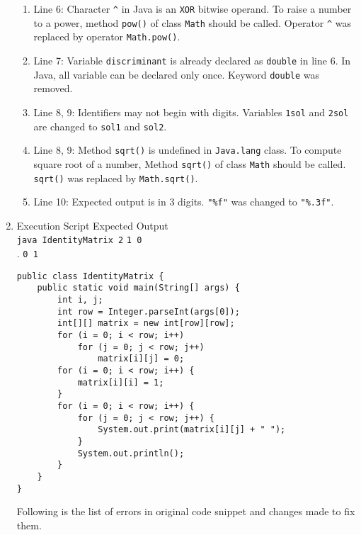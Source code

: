 \begin{enumerate}[label=\textbf{(\alph*)}]
\begin{enumerate}[label=\arabic*.]
\item Line 6: Character \texttt{\^} in Java is an \texttt{XOR} bitwise operand. To raise a number to a power, method \texttt{pow()} of class \texttt{Math} should be called. Operator \texttt{\^} was replaced by operator \texttt{Math.pow()}.
\item Line 7: Variable \texttt{discriminant} is already declared as \texttt{double} in line 6. In Java, all variable can be declared only once. Keyword \texttt{double} was removed.
\item Line 8, 9: Identifiers may not begin with digits. Variables \texttt{1sol} and \texttt{2sol} are changed to \texttt{sol1} and \texttt{sol2}.
\item Line 8, 9: Method \texttt{sqrt()} is undefined in \texttt{Java.lang} class. To compute square root of a number, Method \texttt{sqrt()} of class \texttt{Math} should be called. \texttt{sqrt()} was replaced by \texttt{Math.sqrt()}.
\item Line 10: Expected output is in 3 digits. \texttt{"\%f"} was changed to \texttt{"\%.3f"}.
\end{enumerate}

\item Execution Script \hfill Expected Output\\
\texttt{java IdentityMatrix 2} \hfill \texttt{1 0}\\ . \hfill \texttt{0 1}

\begin{lstlisting}
public class IdentityMatrix {
	public static void main(String[] args) {
		int i, j;
		int row = Integer.parseInt(args[0]);
		int[][] matrix = new int[row][row];
		for (i = 0; i < row; i++)
			for (j = 0; j < row; j++)
				matrix[i][j] = 0;
		for (i = 0; i < row; i++) {
			matrix[i][i] = 1;
		}
		for (i = 0; i < row; i++) {
			for (j = 0; j < row; j++) {
				System.out.print(matrix[i][j] + " ");
			}
			System.out.println();
		}
	}
}
\end{lstlisting}

Following is the list of errors in original code snippet and changes made to fix them.


\end{enumerate}

